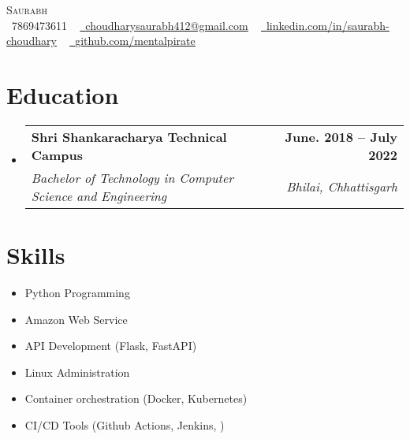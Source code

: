 \documentclass[letterpaper,11pt]{article}
\makeatletter
\newcommand{\resumeSubheading}[4]{
  \vspace{-2pt}\item
    \begin{tabular*}{1.0\textwidth}[t]{l@{\extracolsep{\fill}}r}
      \textbf{#1} & \textbf{\small #2} \\
      \textit{\small#3} & \textit{\small #4} \\
    \end{tabular*}\vspace{-7pt}
}
\newcommand{\resumeSubHeadingListStart}{\begin{itemize}[leftmargin=0.0in, label={}]}
\newcommand{\resumeSubHeadingListEnd}{\end{itemize}}
\makeatother
\begin{document}


\begin{center}
    {\Huge \scshape Saurabh} \\ \vspace{1pt}
    \small \raisebox{-0.1\height}\faPhone\ 7869473611 ~ \href{mailto:choudharysaurabh412@gmail.com}{\raisebox{-0.2\height}\faEnvelope\  \underline{choudharysaurabh412@gmail.com}} ~ 
    \href{https://linkedin.com/in/saurabh-choudhary-379965192/}{\raisebox{-0.2\height}\faLinkedin\ \underline{linkedin.com/in/saurabh-choudhary}}  ~
    \href{https://github.com/mentalpirate}{\raisebox{-0.2\height}\faGithub\ \underline{github.com/mentalpirate}}
    \vspace{-8pt}
\end{center}


\section{Education}
  \resumeSubHeadingListStart
    \resumeSubheading
      {Shri Shankaracharya Technical Campus}{June. 2018 -- July 2022}
      {Bachelor of Technology in Computer Science and Engineering }{Bhilai, Chhattisgarh}
  \resumeSubHeadingListEnd

\section{Skills}
        \begin{multicols}{3}
            \begin{itemize}[itemsep=-5pt, parsep=3pt]
                \item\small Python Programming
                \item Amazon Web Service
                \item API Development (Flask, FastAPI)
                \item Linux Administration
                \item Container orchestration (Docker, Kubernetes)
                \item CI/CD Tools (Github Actions, Jenkins, )

            \end{itemize}
        \end{multicols}
        \vspace*{2.0\multicolsep}
\end{document}
